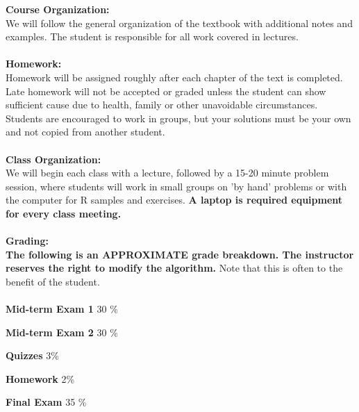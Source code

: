 \documentclass[12pt,a4paper]{article} %
\begin{document}
\noindent \textbf{Course Organization:}\\
\noindent We will follow the general organization of the textbook with additional notes and examples. The student is responsible for all work covered in lectures.\\
\\
\noindent\textbf{Homework:}\\
\noindent Homework will be assigned roughly after each chapter of the text is completed. Late homework will not be accepted or graded unless the student can show sufficient cause due to health, family or other unavoidable circumstances. Students are encouraged to work in groups, but your solutions must be your own and not copied from another student.\\\\
\noindent\textbf{Class Organization:}\\
\noindent We will begin each class with a lecture, followed by a 15-20 minute problem session, where students will work in small groups on 'by hand' problems or with the computer for R samples and exercises. \textbf{A laptop is required equipment for every class meeting.}\\\\
\noindent\textbf{Grading:}\\
\noindent\textbf{The following is an APPROXIMATE grade breakdown. The instructor reserves the right to modify the algorithm.} Note that this is often to the benefit of the student.\\\\

\hspace{1.5in}
\textbf{Mid-term Exam 1} 30 \%

\hspace{1.5in}  
\textbf{Mid-term Exam 2} 30 \%

\hspace{1.5in}  
\textbf{Quizzes} 3\%

\hspace{1.5in}
\textbf{Homework} 2\%

\hspace{1.5in}
\textbf{Final Exam} 35 \%
\end{document}
